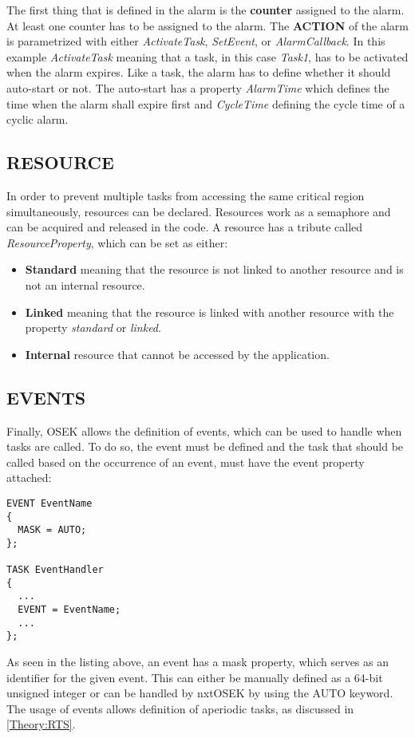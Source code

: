 The first thing that is defined in the alarm is the \textbf{counter} assigned to the alarm.
At least one counter has to be assigned to the alarm.
The \textbf{ACTION} of the alarm is parametrized with either \textit{ActivateTask}, \textit{SetEvent}, or \textit{AlarmCallback}\cite{irisa25}.
In this example \textit{ActivateTask} meaning that a task, in this case \textit{Task1}, has to be activated when the alarm expires. 
Like a task, the alarm has to define whether it should auto-start or not.
The auto-start has a property \textit{AlarmTime} which defines the time when the alarm shall expire first and \textit{CycleTime} defining the cycle time of a cyclic alarm\cite{irisa25}.

\subsection{RESOURCE}
In order to prevent multiple tasks from accessing the same critical region simultaneously, resources can be declared.
Resources work as a semaphore and can be acquired and released in the code.
A resource has a tribute called \textit{ResourceProperty}, which can be set as either:
\begin{itemize}
\item \textbf{Standard} meaning that the resource is not linked to another resource and is not an internal resource.
\item \textbf{Linked} meaning that the resource is linked with another resource with the property \textit{standard} or \textit{linked}.
\item \textbf{Internal} resource that cannot be accessed by the application\cite{irisa25}.
\end{itemize}

\subsection{EVENTS}
Finally, OSEK allows the definition of events, which can be used to handle when tasks are called.
To do so, the event must be defined and the task that should be called based on the occurrence of an event, must have the event property attached:
\begin{lstlisting}
EVENT EventName
{
  MASK = AUTO;
};

TASK EventHandler
{
  ...
  EVENT = EventName;
  ...
};
\end{lstlisting}
As seen in the listing above, an event has a mask property, which serves as an identifier for the given event\cite{irisa25}.
This can either be manually defined as a 64-bit unsigned integer or can be handled by nxtOSEK by using the AUTO keyword.
The usage of events allows definition of aperiodic tasks, as discussed in \autoref{Theory:RTS}.
